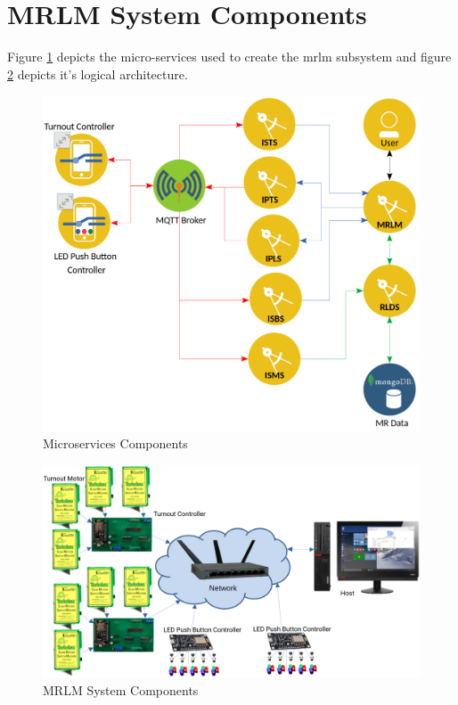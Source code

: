 \section{MRLM System Components}

Figure \ref{fig:mrlm-ms-components} depicts the micro-services used to create the \gls{mrlm} subsystem and figure \ref{fig:turnout-system} depicts it's logical architecture.

\begin{figure}[H]
	\centering
		\includegraphics[scale=0.2]{../Images/mrlm_microservices.png}
	\caption{Microservices Components}
	\label{fig:mrlm-ms-components}
\end{figure}


\begin{figure}[H]
	\centering
		\includegraphics[scale=0.2]{../Images/mrlm_system.png}
	\caption{MRLM System Components}
	\label{fig:turnout-system}
\end{figure}
